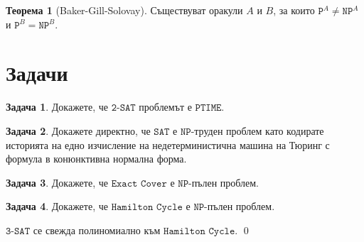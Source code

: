 \documentclass[a4paper]{article}
\theoremstyle{definition}
\newtheorem{theorem}{Теорема}
\newtheorem{problem}{Задача}
\newenvironment{hint}{\noindent{\bf Упътване.}\hspace*{1em}}{\qed\par\vspace*{1em}}
\begin{document}
\begin{theorem}[Baker-Gill-Solovay]
  Съществуват оракули $A$ и $B$, за които $\texttt{P}^A \neq \texttt{NP}^A$ и $\texttt{P}^B = \texttt{NP}^B$.
\end{theorem}



\section{Задачи}


\begin{problem}
  Докажете, че $\texttt{2-SAT}$ проблемът е $\texttt{PTIME}$.
\end{problem}

\begin{problem}
  Докажете директно, че $\texttt{SAT}$ е $\texttt{NP}$-труден проблем
  като кодирате историята на едно изчисление на недетерминистична машина на Тюринг
  с формула в конюнктивна нормална форма.
\end{problem}

\begin{problem}
  Докажете, че $\texttt{Exact Cover}$ е $\texttt{NP}$-пълен проблем.
\end{problem}

\begin{problem}
  Докажете, че $\texttt{Hamilton Cycle}$ е $\texttt{NP}$-пълен проблем.
\end{problem}
\begin{hint}
  $\texttt{3-SAT}$ се свежда полиномиално към $\texttt{Hamilton Cycle}$.
\end{hint}
\end{document}
